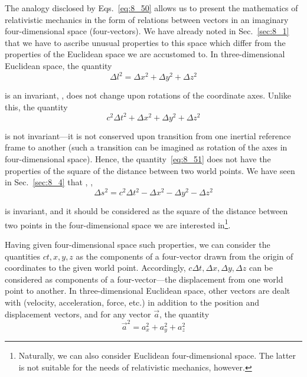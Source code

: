 The analogy disclosed by Eqs.~\eqref{eq:8_50} allows us to present the mathematics of relativistic mechanics in the form of relations between vectors in an imaginary four-dimensional space (four-vectors). We have already noted in Sec.~\ref{sec:8_1} that we have to ascribe unusual properties to this space which differ from the properties of the Euclidean space we are accustomed to. In three-dimensional Euclidean space, the quantity
\begin{equation*}
	\Delta l^2 = \Delta x^2 + \Delta y^2 + \Delta z^2
\end{equation*}

\noindent
is an invariant, \ie, does not change upon rotations of the coordinate axes. Unlike this, the quantity
\begin{equation}\label{eq:8_51}
	c^2\Delta t^2 + \Delta x^2 + \Delta y^2 + \Delta z^2
\end{equation}

\noindent
is not invariant---it is not conserved upon transition from one inertial reference frame to another (such a transition can be imagined as rotation of the axes in four-dimensional space). Hence, the quantity~\eqref{eq:8_51} does not have the properties of the square of the distance between two world points. We have seen in Sec.~\ref{sec:8_4} that , \ie,
\begin{equation*}
	\Delta s^2 = c^2\Delta t^2 - \Delta x^2 - \Delta y^2 - \Delta z^2
\end{equation*}

\noindent
is invariant, and it should be considered as the square of the distance between two points in the four-dimensional space we are interested in\footnote{Naturally, we can also consider Euclidean four-dimensional space. The latter is not suitable for the needs of relativistic mechanics, however.}.

Having given four-dimensional space such properties, we can consider the quantities $ct, x, y, z$ as the components of a four-vector drawn from the origin of coordinates to the given world point. Accordingly, $c\Delta t, \Delta x, \Delta y, \Delta z$ can be considered as components of a four-vector---the displacement from one world point to another. In three-dimensional Euclidean space, other vectors are dealt with (velocity, acceleration, force, etc.) in addition to the position and displacement vectors, and for any vector $\vec{a}$, the quantity
\begin{equation*}
	\vec{a}^2 = a_x^2 + a_y^2 + a_z^2
\end{equation*}

